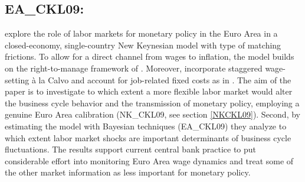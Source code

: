 \documentclass[11pt,a4paper]{article}
\begin{document}
	
	
	\subsection{EA\_CKL09: \texorpdfstring{\cite{ChristoffelKuesterLinzert2009}}{Christoffel et al. (2009)}}
	\label{EACKL09}
	
	\cite{ChristoffelKuesterLinzert2009} explore the role of labor markets for monetary policy in the Euro Area in a closed-economy, single-country New Keynesian model with \cite{MortensenPissarides1994} type of matching frictions. To allow for a direct channel from wages to inflation, the model builds on the right-to-manage framework of \cite{Trigari2006}. Moreover, \cite{ChristoffelKuesterLinzert2009} incorporate staggered wage-setting \`{a} la Calvo and account for job-related fixed costs as in \cite{ChristoffelKuester2008}. The aim of the paper is to investigate to which extent a more flexible labor market would alter the business cycle behavior and the transmission of monetary policy, employing a genuine Euro Area calibration (NK\_CKL09,  see section  \ref{NKCKL09}). Second, by estimating the model with Bayesian techniques (EA\_CKL09) they analyze to which extent labor market shocks are important determinants of business cycle fluctuations. The results support current central bank practice to put considerable effort into monitoring Euro Area wage dynamics and treat some of the other market information as less important for monetary policy.
	
\end{document}
